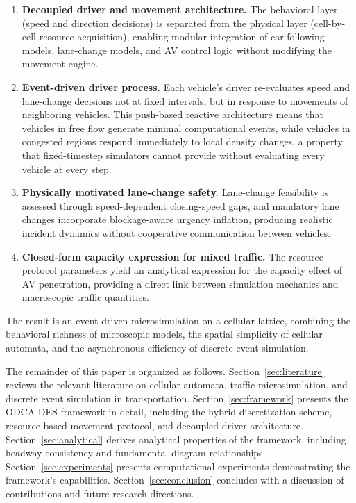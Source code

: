 \documentclass[review,number]{elsarticle} %
\begin{document}
\begin{enumerate}
    \item \textbf{Decoupled driver and movement architecture.} The behavioral layer (speed and direction decisions) is separated from the physical layer (cell-by-cell resource acquisition), enabling modular integration of car-following models, lane-change models, and AV control logic without modifying the movement engine.

    \item \textbf{Event-driven driver process.} Each vehicle's driver re-evaluates speed and lane-change decisions not at fixed intervals, but in response to movements of neighboring vehicles. This push-based reactive architecture means that vehicles in free flow generate minimal computational events, while vehicles in congested regions respond immediately to local density changes, a property that fixed-timestep simulators cannot provide without evaluating every vehicle at every step.

    \item \textbf{Physically motivated lane-change safety.} Lane-change feasibility is assessed through speed-dependent closing-speed gaps, and mandatory lane changes incorporate blockage-aware urgency inflation, producing realistic incident dynamics without cooperative communication between vehicles.

    \item \textbf{Closed-form capacity expression for mixed traffic.} The resource protocol parameters yield an analytical expression for the capacity effect of AV penetration, providing a direct link between simulation mechanics and macroscopic traffic quantities.
\end{enumerate}

The result is an event-driven microsimulation on a cellular lattice, combining the behavioral richness of microscopic models, the spatial simplicity of cellular automata, and the asynchronous efficiency of discrete event simulation.

The remainder of this paper is organized as follows. Section~\ref{sec:literature} reviews the relevant literature on cellular automata, traffic microsimulation, and discrete event simulation in transportation. Section~\ref{sec:framework} presents the ODCA-DES framework in detail, including the hybrid discretization scheme, resource-based movement protocol, and decoupled driver architecture. Section~\ref{sec:analytical} derives analytical properties of the framework, including headway consistency and fundamental diagram relationships. Section~\ref{sec:experiments} presents computational experiments demonstrating the framework's capabilities. Section~\ref{sec:conclusion} concludes with a discussion of contributions and future research directions.
\end{document}
